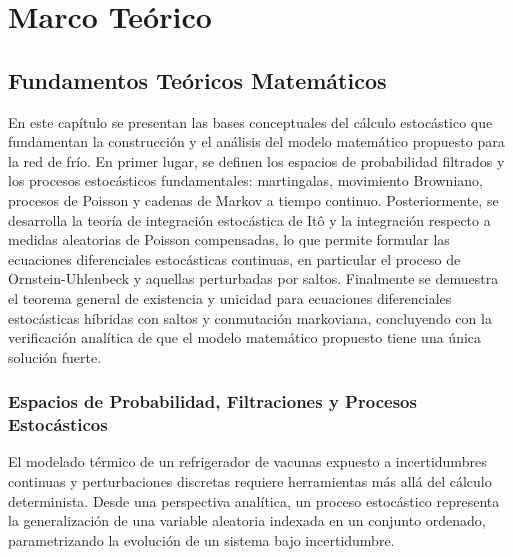 \documentclass[
  spanish,
  us-letterpaper,
]{scrreprt}
\numberwithin{equation}{section}
\theoremstyle{plain}
\theoremstyle{plain}
\theoremstyle{plain}
\theoremstyle{definition}
\theoremstyle{remark}
\begin{document}
\part{Marco Teórico}

\chapter{Fundamentos Teóricos
Matemáticos}\label{sec-fundamentos-matematicos}

En este capítulo se presentan las bases conceptuales del cálculo
estocástico que fundamentan la construcción y el análisis del modelo
matemático propuesto para la red de frío. En primer lugar, se definen
los espacios de probabilidad filtrados y los procesos estocásticos
fundamentales: martingalas, movimiento Browniano, procesos de Poisson y
cadenas de Markov a tiempo continuo. Posteriormente, se desarrolla la
teoría de integración estocástica de Itô y la integración respecto a
medidas aleatorias de Poisson compensadas, lo que permite formular las
ecuaciones diferenciales estocásticas continuas, en particular el
proceso de Ornstein-Uhlenbeck y aquellas perturbadas por saltos.
Finalmente se demuestra el teorema general de existencia y unicidad para
ecuaciones diferenciales estocásticas híbridas con saltos y conmutación
markoviana, concluyendo con la verificación analítica de que el modelo
matemático propuesto tiene una única solución fuerte.

\section{Espacios de Probabilidad, Filtraciones y Procesos
Estocásticos}\label{espacios-de-probabilidad-filtraciones-y-procesos-estocuxe1sticos}

El modelado térmico de un refrigerador de vacunas expuesto a
incertidumbres continuas y perturbaciones discretas requiere
herramientas más allá del cálculo determinista. Desde una perspectiva
analítica, un proceso estocástico representa la generalización de una
variable aleatoria indexada en un conjunto ordenado, parametrizando la
evolución de un sistema bajo incertidumbre.
\end{document}
